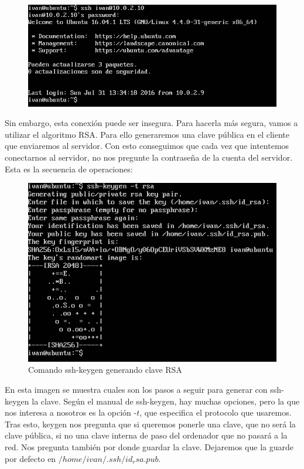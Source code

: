  \begin{figure}[H]
	\centering
	\includegraphics[width=0.7\linewidth]{ssh_no_clave}
	\caption[Sesión ssh]{}
	\caption{}
	\label{fig:ssh_no_clave}
\end{figure}

Sin embargo, esta conexión puede ser insegura. Para hacerla más segura, vamos a utilizar el algoritmo RSA. Para ello generaremos una clave pública en el cliente que enviaremos al servidor. Con esto conseguimos que cada vez que intentemos conectarnos al servidor, no nos pregunte la contraseña de la cuenta del servidor. Esta es la secuencia de operaciones:\\

\begin{figure}[H]
	\centering
	\includegraphics[width=0.7\linewidth]{keygen}
	\caption[Generando clave]{Comando ssh-keygen generando clave RSA}
	\label{fig:keygen}	
\end{figure}

En esta imagen se muestra cuales son los pasos a seguir para generar con ssh-keygen la clave. Según el manual de ssh-keygen\cite{ssh-keygen}, hay muchas opciones, pero la que nos interesa a nosotros es la opción -$t$, que especifica el protocolo que usaremos. Tras esto, keygen nos pregunta que si queremos ponerle una clave, que no será la clave pública, si no una clave interna de paso del ordenador que no pasará a la red. Nos pregunta también por donde guardar la clave. Dejaremos que la guarde por defecto en $/home/ivan/.ssh/id_rsa.pub$. \\

